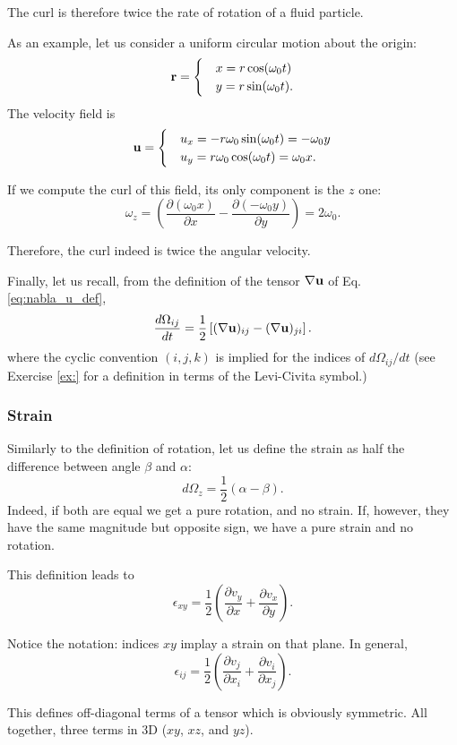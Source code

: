 The curl is therefore twice the rate of rotation of a fluid particle.


As an example, let us consider a uniform circular motion about the
origin:
\[
\mathbf{r} =
\begin{cases}
&x=r \cos(\omega_0 t) \\
&y=r \sin(\omega_0 t) .
\end{cases}
\]
The velocity field is
\[
\mathbf{u} =
\begin{cases}
&u_x= -r \omega_0 \sin(\omega_0 t) = -\omega_0 y \\
&u_y=  r \omega_0 \cos(\omega_0 t) =  \omega_0 x.
\end{cases}
\]

If we compute the curl of this field, its only component is the $z$ one:
\[
\omega_z= \left(
  \frac{\partial (\omega_0  x)}{\partial x}  -
  \frac{\partial (- \omega_0 y) }{\partial y}
\right) =  2 \omega_0 . 
\]

Therefore, the curl indeed is twice the angular velocity.

Finally, let us recall, from the definition of the tensor
$\nabla \mathbf{u}$ of Eq. \ref{eq:nabla_u_def},
\[
\frac{d\Omega_{ij}}{dt} = \frac12
\left[
 (\nabla \mathbf{u})_{ij} -
 (\nabla \mathbf{u})_{ji}
\right] .
\]
where the cyclic convention $(i,j,k)$ is implied for the indices of
$d\Omega_{ij}/ dt$ (see Exercise \ref{ex:} for a definition in terms
of the Levi-Civita symbol.)


\subsubsection{Strain}

Similarly to the definition of rotation, let us define the strain as
half the difference between angle $\beta$ and $\alpha$:
\[
d\Omega_z = \frac12
\left(
        \alpha - \beta
\right) .
\]
Indeed, if both are equal we get a pure rotation, and no strain. If,
however, they have the same magnitude but opposite sign, we have a pure
strain and no rotation.

This definition leads to
\[
\epsilon_{xy} = \frac12
\left(
  \frac{\partial v_y}{\partial x}  +
  \frac{\partial v_x}{\partial y}
\right) .
\]

Notice the notation: indices $xy$ implay a strain on that plane. In general,
\[
\epsilon_{ij} = \frac12
\left(
  \frac{\partial v_j}{\partial x_i}  +
  \frac{\partial v_i}{\partial x_j}
\right) .
\]

This defines off-diagonal terms of a tensor which is obviously
symmetric. All together, three terms in 3D ($xy$, $xz$, and $yz$).

